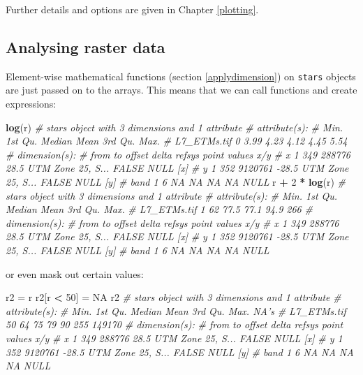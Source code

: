 \documentclass[]{book}
\newenvironment{Shaded}{\begin{snugshade}}{\end{snugshade}}
\newcommand{\CommentTok}[1]{\textcolor[rgb]{0.56,0.35,0.01}{\textit{#1}}}
\newcommand{\DecValTok}[1]{\textcolor[rgb]{0.00,0.00,0.81}{#1}}
\newcommand{\KeywordTok}[1]{\textcolor[rgb]{0.13,0.29,0.53}{\textbf{#1}}}
\newcommand{\NormalTok}[1]{#1}
\newcommand{\OperatorTok}[1]{\textcolor[rgb]{0.81,0.36,0.00}{\textbf{#1}}}
\newcommand{\OtherTok}[1]{\textcolor[rgb]{0.56,0.35,0.01}{#1}}
\newcommand{\StringTok}[1]{\textcolor[rgb]{0.31,0.60,0.02}{#1}}
\begin{document}
Further details and options are given in Chapter \ref{plotting}.

\hypertarget{analysing-raster-data}{%
\subsection{Analysing raster data}\label{analysing-raster-data}}

Element-wise mathematical functions (section \ref{applydimension})
on \texttt{stars} objects are just passed on to the arrays. This means
that we can call functions and create expressions:

\begin{Shaded}
\begin{Highlighting}[]
\KeywordTok{log}\NormalTok{(r)}
\CommentTok{# stars object with 3 dimensions and 1 attribute}
\CommentTok{# attribute(s):}
\CommentTok{#              Min. 1st Qu. Median Mean 3rd Qu. Max.}
\CommentTok{# L7_ETMs.tif     0    3.99   4.23 4.12    4.45 5.54}
\CommentTok{# dimension(s):}
\CommentTok{#      from  to  offset delta            refsys point values x/y}
\CommentTok{# x       1 349  288776  28.5 UTM Zone 25, S... FALSE   NULL [x]}
\CommentTok{# y       1 352 9120761 -28.5 UTM Zone 25, S... FALSE   NULL [y]}
\CommentTok{# band    1   6      NA    NA                NA    NA   NULL}
\NormalTok{r }\OperatorTok{+}\StringTok{ }\DecValTok{2} \OperatorTok{*}\StringTok{ }\KeywordTok{log}\NormalTok{(r)}
\CommentTok{# stars object with 3 dimensions and 1 attribute}
\CommentTok{# attribute(s):}
\CommentTok{#              Min. 1st Qu. Median Mean 3rd Qu. Max.}
\CommentTok{# L7_ETMs.tif     1      62   77.5 77.1    94.9  266}
\CommentTok{# dimension(s):}
\CommentTok{#      from  to  offset delta            refsys point values x/y}
\CommentTok{# x       1 349  288776  28.5 UTM Zone 25, S... FALSE   NULL [x]}
\CommentTok{# y       1 352 9120761 -28.5 UTM Zone 25, S... FALSE   NULL [y]}
\CommentTok{# band    1   6      NA    NA                NA    NA   NULL}
\end{Highlighting}
\end{Shaded}

or even mask out certain values:

\begin{Shaded}
\begin{Highlighting}[]
\NormalTok{r2 =}\StringTok{ }\NormalTok{r}
\NormalTok{r2[r }\OperatorTok{<}\StringTok{ }\DecValTok{50}\NormalTok{] =}\StringTok{ }\OtherTok{NA}
\NormalTok{r2}
\CommentTok{# stars object with 3 dimensions and 1 attribute}
\CommentTok{# attribute(s):}
\CommentTok{#              Min. 1st Qu. Median Mean 3rd Qu. Max.   NA's}
\CommentTok{# L7_ETMs.tif    50      64     75   79      90  255 149170}
\CommentTok{# dimension(s):}
\CommentTok{#      from  to  offset delta            refsys point values x/y}
\CommentTok{# x       1 349  288776  28.5 UTM Zone 25, S... FALSE   NULL [x]}
\CommentTok{# y       1 352 9120761 -28.5 UTM Zone 25, S... FALSE   NULL [y]}
\CommentTok{# band    1   6      NA    NA                NA    NA   NULL}
\end{Highlighting}
\end{Shaded}
\end{document}

